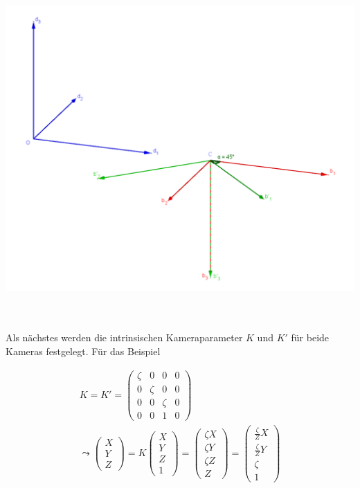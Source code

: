 \begin{minipage}{\linewidth}
	\centering
	\includegraphics[width=1.\linewidth]{images/GrafikHomographieSameC.png}
\end{minipage}\\ \\

Als nächstes werden die intrinsischen Kameraparameter $K$ und $K'$ für beide Kameras festgelegt. Für das Beispiel

\begin{gather}
K=K'
= 
\begin{pmatrix}
\zeta&0&0&0\\
0&\zeta&0&0\\
0&0&\zeta&0\\
0&0&1&0
\end{pmatrix}\\
\leadsto
\begin{pmatrix}
X\\Y\\Z
\end{pmatrix} = 
K
\begin{pmatrix}
X\\Y\\Z\\1
\end{pmatrix}
=
\begin{pmatrix}
\zeta X\\\zeta Y\\\zeta Z\\Z
\end{pmatrix}
=
\begin{pmatrix}
\frac{\zeta}{Z} X\\\frac{\zeta}{Z} Y\\\zeta\\1
\end{pmatrix}
\end{gather}\\

